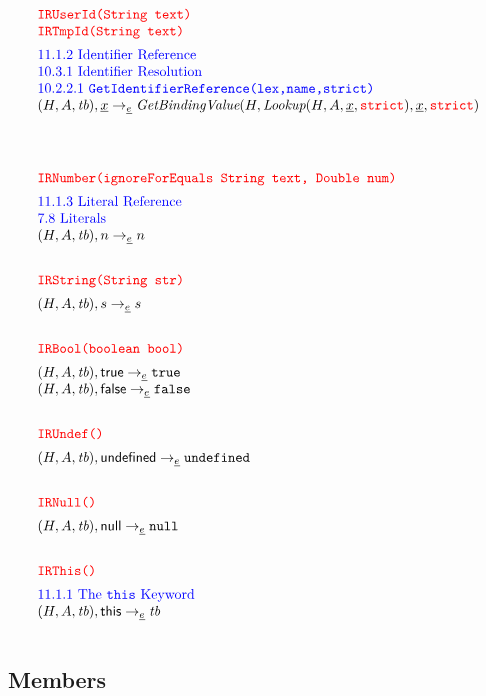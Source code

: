 \[\begin{array}{l@{~~}l@{~~}ll}
\mtt{\normalsize\inred IRUserId(String text)}\\
\mtt{\normalsize\inred IRTmpId(String text)}\\[.5em]
\mbox{\inblue 11.1.2 Identifier Reference}\\
\mbox{\inblue 10.3.1 Identifier Resolution}\\
\mbox{\inblue 10.2.2.1 {\tt GetIdentifierReference(lex,name,strict)}}\\


\evale, \irid \rightarrow_{\ir\expr} \hf{GetBindingValue}(H,\hf{Lookup}(H,A,\irid,\strict), \irid, \strict)
\\[4em]


\mtt{\normalsize\inred IRNumber(ignoreForEquals String text, Double num)}\\[.5em]
\mbox{\inblue 11.1.3 Literal Reference}\\
\mbox{\inblue 7.8 Literals}\\
\evale, n \rightarrow_{\ir\expr} n\\[2em]

\mtt{\normalsize\inred IRString(String str)}\\[.5em]
\evale, s \rightarrow_{\ir\expr} s\\[2em]

\mtt{\normalsize\inred IRBool(boolean bool)}\\[.5em]
\evale, {\sf true} \rightarrow_{\ir\expr} \true\\
\evale, {\sf false} \rightarrow_{\ir\expr} \false\\[2em]

\mtt{\normalsize\inred IRUndef()}\\[.5em]
\evale, {\sf undefined} \rightarrow_{\ir\expr} \undef\\[2em]

\mtt{\normalsize\inred IRNull()}\\[.5em]
\evale, {\sf null} \rightarrow_{\ir\expr} \nullK\\[2em]

\mtt{\normalsize\inred IRThis()}\\[.5em]
\mbox{\inblue 11.1.1 The {\tt this} Keyword}\\
\evale, {\sf this} \rightarrow_{\ir\expr} \tb\\[1em]
\end{array}
\]

\subsection{Members}


